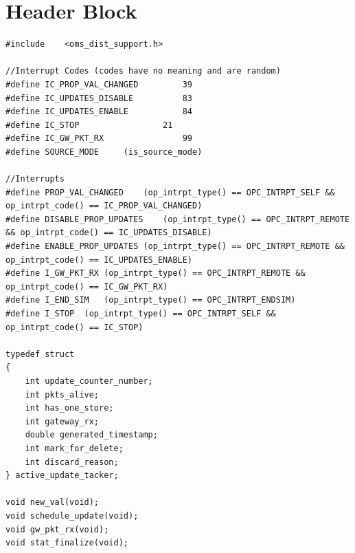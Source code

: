 \section{Header Block}
{\tiny
\begin{verbatim}
#include	<oms_dist_support.h>

//Interrupt Codes (codes have no meaning and are random)
#define IC_PROP_VAL_CHANGED 		39
#define IC_UPDATES_DISABLE	 		83
#define IC_UPDATES_ENABLE			84
#define IC_STOP					21
#define IC_GW_PKT_RX				99
#define SOURCE_MODE		(is_source_mode)

//Interrupts 
#define PROP_VAL_CHANGED	(op_intrpt_type() == OPC_INTRPT_SELF && op_intrpt_code() == IC_PROP_VAL_CHANGED)
#define DISABLE_PROP_UPDATES	(op_intrpt_type() == OPC_INTRPT_REMOTE && op_intrpt_code() == IC_UPDATES_DISABLE)
#define ENABLE_PROP_UPDATES	(op_intrpt_type() == OPC_INTRPT_REMOTE && op_intrpt_code() == IC_UPDATES_ENABLE)
#define I_GW_PKT_RX	(op_intrpt_type() == OPC_INTRPT_REMOTE && op_intrpt_code() == IC_GW_PKT_RX)
#define I_END_SIM	(op_intrpt_type() == OPC_INTRPT_ENDSIM)
#define I_STOP	(op_intrpt_type() == OPC_INTRPT_SELF && op_intrpt_code() == IC_STOP)

typedef struct
{
	int update_counter_number;
	int pkts_alive;
	int has_one_store;
	int gateway_rx;
	double generated_timestamp;
	int mark_for_delete;
	int discard_reason;
} active_update_tacker;

void new_val(void);
void schedule_update(void);
void gw_pkt_rx(void);
void stat_finalize(void);
\end{verbatim}
}

